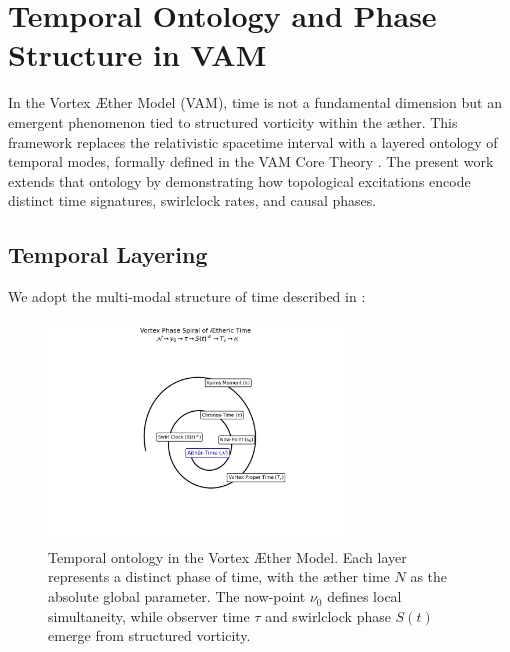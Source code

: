 \section{Temporal Ontology and Phase Structure in VAM}

In the Vortex \AE ther Model (VAM), time is not a fundamental dimension but an emergent phenomenon tied to structured vorticity within the æther. This framework replaces the relativistic spacetime interval with a layered ontology of temporal modes, formally defined in the VAM Core Theory \cite{Iskandarani2025VAM}. The present work extends that ontology by demonstrating how topological excitations encode distinct time signatures, swirlclock rates, and causal phases.

\subsection*{Temporal Layering}

We adopt the multi-modal structure of time described in \cite{Iskandarani2025VAM}:
\begin{figure}[H]
    \centering
    \includegraphics[width=0.7\textwidth]{images/TemporalOntologyv2}
    \caption{Temporal ontology in the Vortex Æther Model. Each layer represents a distinct phase of time, with the æther time $N$ as the absolute global parameter. The now-point $\nu_0$ defines local simultaneity, while observer time $\tau$ and swirlclock phase $S(t)$ emerge from structured vorticity.}
\end{figure}

